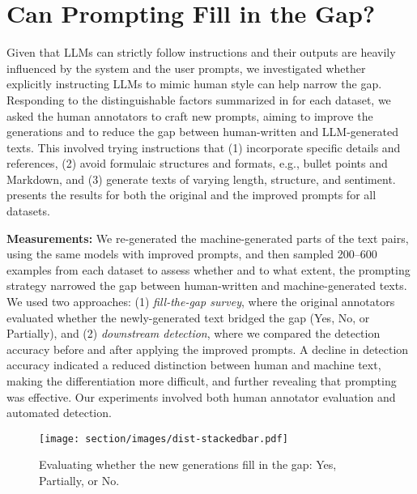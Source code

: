 \section{Can Prompting Fill in the Gap?}

Given that LLMs can strictly follow instructions and their outputs are heavily influenced by the system and the user prompts, we investigated whether explicitly instructing LLMs to mimic human style can help narrow the gap. 
Responding to the distinguishable factors summarized in  for each dataset, we asked the human annotators to craft new prompts, aiming to improve the generations and to reduce the gap between human-written and LLM-generated texts. This involved trying instructions that (1) incorporate specific details and references, (2) avoid formulaic structures and formats, e.g., bullet points and Markdown, and (3) generate texts of varying length, structure, and sentiment.
 presents the results for both the original and the improved prompts for all datasets.  


\textbf{Measurements:}
We re-generated the machine-generated parts of the text pairs, using the same models with improved prompts, and then sampled 200–600 examples from each dataset to assess whether and to what extent, the prompting strategy narrowed the gap between human-written and machine-generated texts. 
We used two approaches: (1) \textit{fill-the-gap survey}, where the original annotators evaluated whether the newly-generated text bridged the gap (Yes, No, or Partially), and (2) \textit{downstream detection}, where we compared the detection accuracy before and after applying the improved prompts. A decline in detection accuracy indicated a reduced distinction between human and machine text, making the differentiation more difficult, and further revealing that prompting was effective. Our experiments involved both human annotator evaluation and automated detection. 

\begin{figure}[t!]
    \centering
    \texttt{[image: section/images/dist-stackedbar.pdf]} 
    \caption{Evaluating whether the new generations fill in the gap: Yes, Partially, or No.}
    \label{fig:dist-survey}
\end{figure}


